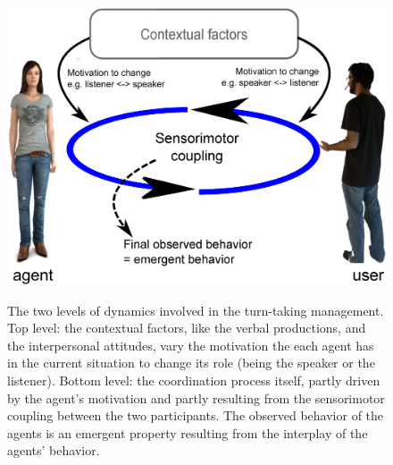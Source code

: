 \begin{figure}
  \centering
  \includegraphics[width=\linewidth]{figure/schema_motivation.eps}
  \label{mot}
  \caption{The two levels of dynamics involved in the turn-taking management. 
    Top level: the contextual factors, like the verbal productions, and the interpersonal attitudes, vary the motivation the each agent has in the current situation to change its role (being the speaker or the listener). 
Bottom level: the coordination process itself, partly driven by the agent's motivation and partly resulting from the sensorimotor coupling between the two participants. 
The observed behavior of the agents is an emergent property resulting from the interplay of the agents' behavior.}
\end{figure}

